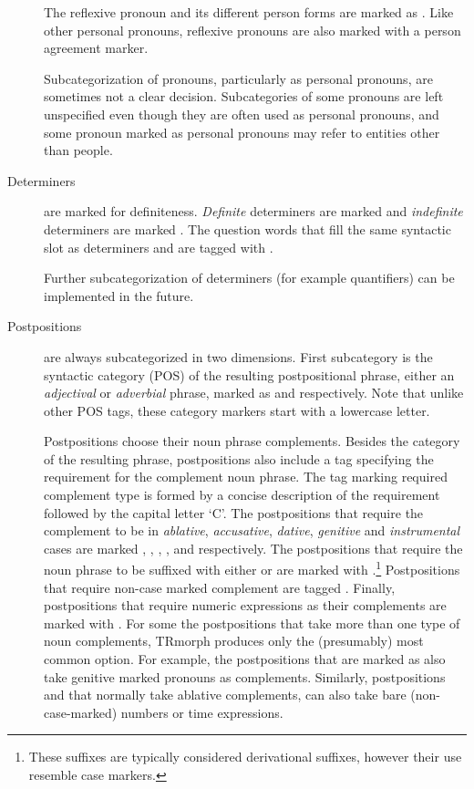\documentclass[twocolumn]{article}
\begin{document}
\begin{description}
The reflexive pronoun  and its different person forms are
marked as . Like other personal pronouns,
reflexive pronouns are also marked with a person agreement marker.

Subcategorization of pronouns, particularly as personal pronouns, are
sometimes not a clear decision. Subcategories of some pronouns are
left unspecified even though they are often used as personal
pronouns, and some pronoun marked as personal pronouns may refer to
entities other than people.

\item[Determiners] are marked for definiteness. 
\emph{Definite} determiners are marked  and
\emph{indefinite} determiners are marked . The question
words that fill the same syntactic slot as determiners  and
 are tagged with . 

Further subcategorization of determiners (for example 
quantifiers) can be implemented in the future.

\item[Postpositions] are always subcategorized in two dimensions.
First subcategory is the syntactic category (POS) of the resulting
postpositional phrase, either an \emph{adjectival} or \emph{adverbial}
phrase, marked as  and 
respectively. Note that unlike other POS tags, these category
markers start with a lowercase letter.

Postpositions choose their noun phrase complements. Besides the
category of the resulting phrase, postpositions also include a tag
specifying the requirement for the complement noun phrase. The tag
marking required complement type is formed by a concise
description of the requirement followed by the capital letter `C'. The
postpositions that require the complement to be in \emph{ablative},
\emph{accusative}, \emph{dative}, \emph{genitive} and \emph{instrumental} cases are marked 
,
,
,
,
and  respectively. The
postpositions that require the noun phrase to be suffixed with either
 or  are marked with
.\footnote{These suffixes are typically considered derivational suffixes, 
however their use resemble case markers.}
Postpositions that require
non-case marked complement are tagged .  Finally, postpositions that require numeric expressions as their
complements are marked with .
For some the postpositions that take more than one type of noun complements,
TRmorph produces only the (presumably) most common option.
For example, the postpositions that are marked as  also take genitive marked pronouns as complements.
Similarly, postpositions  and  that normally take ablative complements,
can also take bare (non-case-marked) numbers or time expressions.



\end{description}
\end{document}
